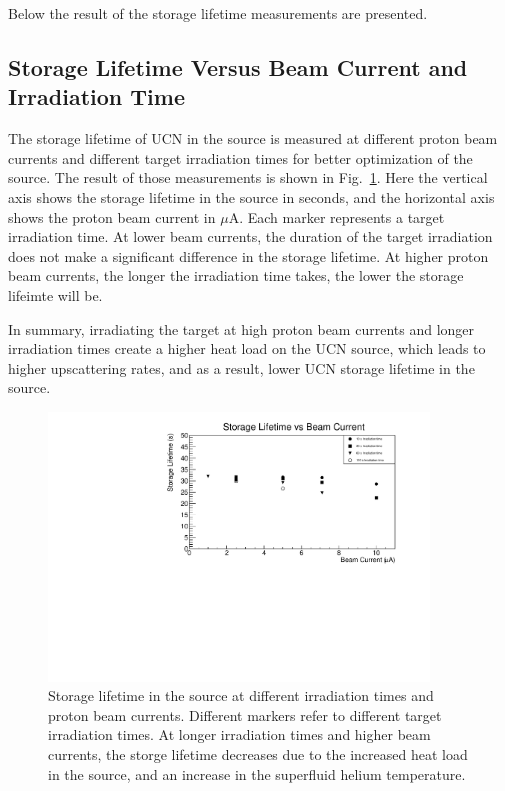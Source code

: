 Below the result of the storage lifetime measurements are presented.

\subsection{Storage Lifetime Versus Beam Current and Irradiation Time}
The storage lifetime of UCN in the source is measured at different
proton beam currents and different target irradiation times for better
optimization of the source. The result of those measurements is shown
in Fig.~\ref{fig:storage_beam_irrad}. Here the vertical axis shows the
storage lifetime in the source in seconds, and the horizontal axis
shows the proton beam current in $\mu$A. Each marker represents a
target irradiation time. At lower beam currents, the duration of the
target irradiation does not make a significant difference in the
storage lifetime. At higher proton beam currents, the longer the
irradiation time takes, the lower the storage lifeimte will be.

In summary, irradiating the target at high proton beam currents and
longer irradiation times create a higher heat load on the UCN source,
which leads to higher upscattering rates, and as a result, lower UCN
storage lifetime in the source.

\begin{figure}[h!]
  \centering
  \includegraphics[width=0.9\textwidth]{StorageLifetime_17009_and_17009A.pdf}
  \caption{Storage lifetime in the source at different irradiation
    times and proton beam currents. Different markers refer to
    different target irradiation times. At longer irradiation times
    and higher beam currents, the storge lifetime decreases due to the
    increased heat load in the source, and an increase in the
    superfluid helium temperature. }
  \label{fig:storage_beam_irrad}
\end{figure}


